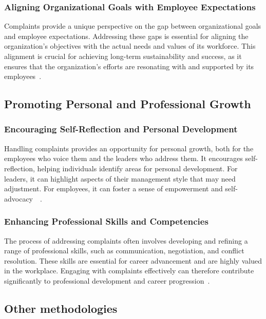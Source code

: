 \documentclass[runningheads]{llncs}
\begin{document}
\subsubsection{Aligning Organizational Goals with Employee Expectations}
Complaints provide a unique perspective on the gap between organizational goals and employee expectations. Addressing these gaps is essential for aligning the organization’s objectives with the actual needs and values of its workforce. This alignment is crucial for achieving long-term sustainability and success, as it ensures that the organization's efforts are resonating with and supported by its employees~\cite{reissner2013generating}.

\subsection{Promoting Personal and Professional Growth}
\subsubsection{Encouraging Self-Reflection and Personal Development}
Handling complaints provides an opportunity for personal growth, both for the employees who voice them and the leaders who address them. It encourages self-reflection, helping individuals identify areas for personal development. For leaders, it can highlight aspects of their management style that may need adjustment. For employees, it can foster a sense of empowerment and self-advocacy~\cite{smither2005relationship}~\cite{anitha2014determinants}.
\subsubsection{Enhancing Professional Skills and Competencies}
The process of addressing complaints often involves developing and refining a range of professional skills, such as communication, negotiation, and conflict resolution. These skills are essential for career advancement and are highly valued in the workplace. Engaging with complaints effectively can therefore contribute significantly to professional development and career progression~\cite{shriver2020response}.
\subsection{Other methodologies}
\end{document}
